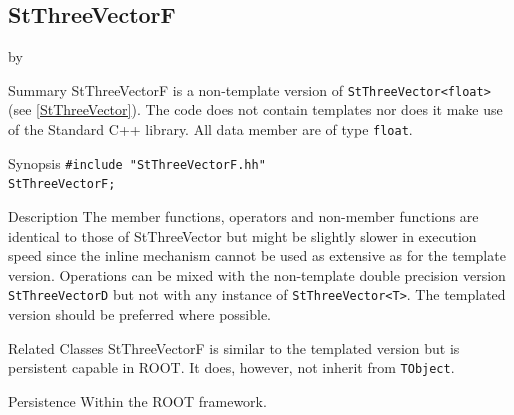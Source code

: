 \documentclass[twoside]{article}
\newcommand{\entrylabel}[1]{\mbox{\textbf{{#1}}}\hfil}%
\newenvironment{entry}
{\begin{list}{}%
    {\renewcommand{\makelabel}{\entrylabel}%
     \setlength{\labelwidth}{90pt}%
     \setlength{\leftmargin}{\labelwidth}
     \advance\leftmargin by \labelsep%
      }%
    }%
  {\end{list}}
\newcommand{\Entrylabel}[1]%
{\raisebox{0pt}[1ex][0pt]{\makebox[\labelwidth][l]%
    {\parbox[t]{\labelwidth}{\hspace{0pt}\textbf{{#1}}}}}}
\newenvironment{Entry}%
{\renewcommand{\entrylabel}{\Entrylabel}\begin{entry}}%
  {\end{entry}}
\begin{document}
\subsection{StThreeVectorF }
\begin{Entry}
\item[Summary]
    StThreeVectorF is a non-template version of \verb+StThreeVector<float>+
    (see \ref{StThreeVector}). The code does not contain templates nor
    does it make use of the Standard C++ library. All data member are of
    type \texttt{float}.
    
\item[Synopsis]
    \verb+#include "StThreeVectorF.hh"+ \\
    \verb+StThreeVectorF;+
    
\item[Description]       
    The member functions, operators and non-member functions are identical
    to those of StThreeVector but might be slightly slower in execution speed
    since the inline mechanism cannot be used as extensive as for the template
    version. Operations can be mixed with the non-template double precision version
    \texttt{StThreeVectorD} but not with any instance of \verb+StThreeVector<T>+.
    The templated version should be preferred where possible.

\item[Related Classes]
    StThreeVectorF is similar to the templated version but
    is persistent capable in ROOT. It does, however, not inherit
    from \texttt{TObject}.

\item[Persistence]
    Within the ROOT framework.

\end{Entry}

\clearpage

%
%
\end{document}
